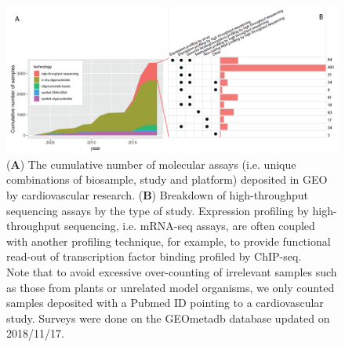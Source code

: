 \documentclass[letter]{bioinfo}
\begin{document}
		
	\begin{figure}[!tpb]
		\includegraphics[width=1\linewidth]{assay-count-cardio}
		\caption{(\textbf{A}) The cumulative number of molecular assays (i.e. unique combinations of biosample, study and platform) deposited in GEO by cardiovascular research. (\textbf{B}) Breakdown of high-throughput sequencing assays by the type of study. Expression profiling by high-throughput sequencing, i.e. mRNA-seq assays, are often coupled with another profiling technique, for example, to provide functional read-out of transcription factor binding profiled by ChIP-seq. \label{fig:geo-assay}\\ Note that to avoid excessive over-counting of irrelevant samples such as those from plants or unrelated model organisms, we only counted samples deposited with a Pubmed ID pointing to a cardiovascular study. Surveys were done on the GEOmetadb database \citep{Zhu:2008:GEOmetadb} updated on 2018/11/17.}
	\end{figure} 
		    
\end{document}
